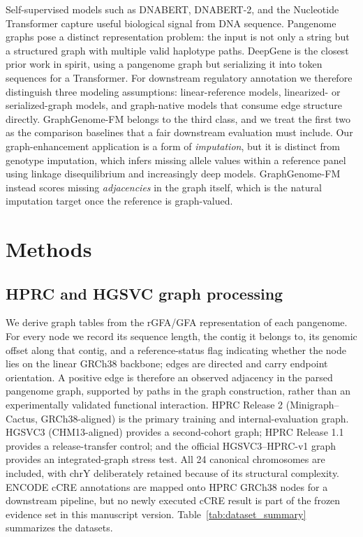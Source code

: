 \IfFileExists{ws-procs11x85.cls}{\worldscientificclasstrue\documentclass{ws-procs11x85}}{\worldscientificclassfalse\documentclass[11pt]{article}\usepackage[margin=1in]{geometry}}
\begin{document}
Self-supervised models such as DNABERT, DNABERT-2, and the Nucleotide
Transformer capture useful biological signal from DNA
sequence.\cite{ji2021dnabert,zhou2024dnabert2,dallatorre2025nt} Pangenome graphs
pose a distinct representation problem: the input is not only a string but a
structured graph with multiple valid haplotype paths. DeepGene is the closest
prior work in spirit, using a pangenome graph but serializing it into token
sequences for a Transformer.\cite{zhang2025deepgene} For downstream regulatory
annotation we therefore distinguish three modeling assumptions: linear-reference
models, linearized- or serialized-graph models, and graph-native models that
consume edge structure directly. GraphGenome-FM
belongs to the third class, and we treat the first two as the comparison
baselines that a fair downstream evaluation must include. Our graph-enhancement
application is a form of \emph{imputation}, but it is distinct from genotype
imputation, which infers missing allele values within a reference panel using
linkage disequilibrium and increasingly deep models.\cite{mowlaei2025stici}
GraphGenome-FM instead scores missing \emph{adjacencies} in the graph itself,
which is the natural imputation target once the reference is graph-valued.

\section{Methods}

\subsection{HPRC and HGSVC graph processing}

We derive graph tables from the rGFA/GFA representation of each pangenome. For
every node we record its sequence length, the contig it belongs to, its genomic
offset along that contig, and a reference-status flag indicating whether the node
lies on the linear GRCh38 backbone; edges are directed and carry endpoint
orientation. A positive edge is therefore an observed adjacency in the parsed
pangenome graph, supported by paths in the graph construction, rather than an
experimentally validated functional interaction. HPRC Release 2
(Minigraph--Cactus, GRCh38-aligned) is the primary training and
internal-evaluation graph. HGSVC3 (CHM13-aligned) provides a second-cohort graph;
HPRC Release 1.1 provides a release-transfer control; and the official
HGSVC3--HPRC-v1 graph provides an integrated-graph stress test. All 24 canonical
chromosomes are included, with chrY deliberately retained because of its
structural complexity.\cite{hallast2023ychrom} ENCODE cCRE annotations are
mapped onto HPRC GRCh38 nodes for a downstream pipeline, but no newly executed
cCRE result is part of the frozen evidence set in this manuscript version.
Table~\ref{tab:dataset_summary} summarizes the datasets.
\end{document}
